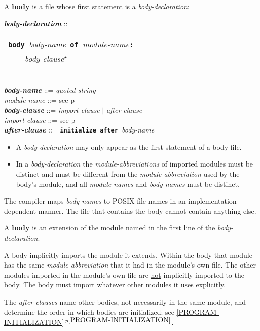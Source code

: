 \documentclass[12pt]{article}
\newcommand{\TT}[1]{{\tt \bfseries #1}}
\newcommand{\STAR}{{\Large $^\star$}}
\newcommand{\key}[1]{{\rm \bfseries #1}}
\newcommand{\ttkey}[1]{{\tt \bfseries #1}}
\newcommand{\emkey}[1]{{\em \bfseries #1}}
\newcommand{\itemref}[1]{\ref{#1}$\,^{p\pageref{#1}}$}
\newcommand{\pagref}[1]{p\pageref{#1}}
\newenvironment{indpar}[1][0.3in]%
	{\begin{list}{}%
		     {\setlength{\itemsep}{0in}%
		      \setlength{\topsep}{0in}%
		      \setlength{\parsep}{1ex}%
		      \setlength{\labelwidth}{#1}%
		      \setlength{\leftmargin}{#1}%
		      \addtolength{\leftmargin}{\labelsep}}%
	 \item}%
	{\end{list}}
\begin{document}
A \key{body} is a file whose first statement is a {\em body-declaration}:

\begin{indpar}
\emkey{body-declaration}\label{BODY-DECLARATION} ::=
    \begin{tabular}[t]{l}
    \TT{body }{\em body-name}\TT{ of }{\em module-name}\TT{:} \\
    \TT{~~~~}{\em body-clause}\STAR{} \\
    \end{tabular}
\\[0.5ex]
\emkey{body-name} ::= {\em quoted-string}
\\[0.5ex]
{\em module-name} ::= see \pagref{MODULE-NAME}
\\[0.5ex]
\emkey{body-clause} ::= {\em import-clause} $|$ {\em after-clause}
\\[0.5ex]
{\em import-clause} ::= see \pagref{IMPORT-CLAUSE}
\\[0.5ex]
\emkey{after-clause} ::= \ttkey{initialize after }{\em body-name}

\begin{itemize}

\item
A {\em body-declaration} may only appear as the first statement
of a body file.

\item
In a {\em body-declaration} the {\em module-abbreviations} of imported
modules must be distinct and must be different from the
{\em module-abbreviation} used by the body's module,
and all {\em module-names} and {\em body-names} must be distinct.
\end{itemize}

\end{indpar}

The compiler maps {\em body-names} to POSIX file names in an
implementation dependent manner.  The file that contains the
body cannot contain anything else.

A \key{body} is an extension of the module named in the first
line of the {\em body-declaration}.

A body implicitly imports the module it extends.  Within the
body that module has the same {\em module-abbreviation} that it
had in the module's own file.  The other modules imported in the
module's own file are \underline{not} implicitly imported
to the body.  The body must import whatever other modules it uses
explicitly.

The {\em after-clauses} name other bodies, not necessarily in
the same module,
and determine the order in which bodies are initialized:
see \itemref{PROGRAM-INITIALIZATION}.
\end{document}
